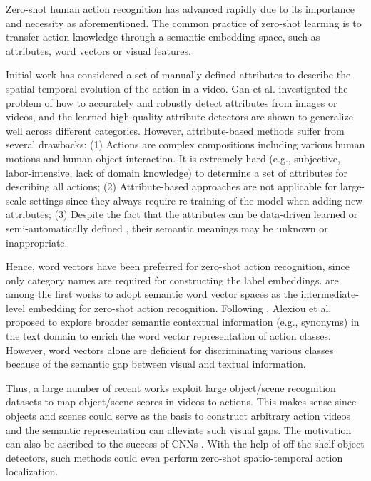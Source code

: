 \documentclass[10pt,twocolumn,letterpaper]{article}
\begin{document}
Zero-shot human action recognition has advanced rapidly due to its importance and necessity as aforementioned. The common practice of zero-shot learning is to transfer action knowledge through a semantic embedding space, such as attributes, word vectors or visual features.

Initial work \cite{2011_Liu_zsl_action} has considered a set of manually defined attributes to describe the spatial-temporal evolution of the action in a video. 
Gan et al. \cite{mutlisource_zs_Gan_CVPR16} investigated the problem of how to accurately and robustly detect attributes from images or videos, and the learned high-quality attribute detectors are shown to generalize well across different categories. However, attribute-based methods suffer from several drawbacks: (1) Actions are complex compositions including various human motions and human-object interaction. It is extremely hard (e.g., subjective, labor-intensive, lack of domain knowledge) to determine a set of attributes for describing all actions; (2) Attribute-based approaches are not applicable for large-scale settings since they always require re-training of the model when adding new attributes; (3) Despite the fact that the attributes can be data-driven learned or semi-automatically defined \cite{latent_attr_Fu_PAMI13}, their semantic meanings may be unknown or inappropriate. 

Hence, word vectors have been preferred for zero-shot action recognition, since only category names are required for constructing the label embeddings.
\cite{tme_zs_Fu_ECCV14,2015_ICIP_Xuxun} are among the first works to adopt semantic word vector spaces as the intermediate-level embedding for zero-shot action recognition. Following \cite{2015_ICIP_Xuxun}, Alexiou et al. \cite{synonyms_Alexiou_ICIP2016} proposed to explore broader semantic contextual information (e.g., synonyms) in the text domain to enrich the word vector representation of action classes. However, word vectors alone are deficient for discriminating various classes because of the semantic gap between visual and textual information. 

Thus, a large number of recent works \cite{2015_ICCV_ZSL_detection,domain_adapt_Li_ICIP16,object_scene_Wu_CVPR16,alter_semantic_Wang_PKDD17} exploit large object/scene recognition datasets to map object/scene scores in videos to actions. This makes sense since objects and scenes could serve as the basis to construct arbitrary action videos and the semantic representation can alleviate such visual gaps. The motivation can also be ascribed to the success of CNNs \cite{material_jiaxue_cvpr17,idr_CGAN_zhang17,ground_jiaxue_cvpr18}. With the help of off-the-shelf object detectors, such methods \cite{2017_ICCV_Spatial_aware} could even perform zero-shot spatio-temporal action localization. 
\end{document}
